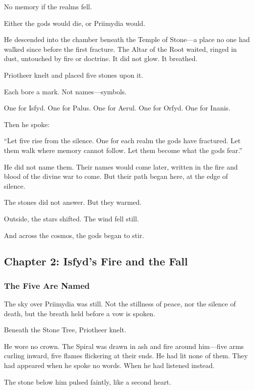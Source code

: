 \documentclass[12pt]{article}
\begin{document}
No memory if the realms fell. 

Either the gods would die, or Priimydia would.

He descended into the chamber beneath the Temple of Stone—a place no one had walked since before the first fracture. The Altar of the Root waited, ringed in dust, untouched by fire or doctrine. It did not glow. It breathed.

Priotheer knelt and placed five stones upon it.

Each bore a mark. Not names—symbols.

One for Isfyd. One for Palus. One for Aerul. One for Orfyd. One for Inanis.

Then he spoke:

“Let five rise from the silence. One for each realm the gods have fractured.  
Let them walk where memory cannot follow.  
Let them become what the gods fear.”

He did not name them. Their names would come later, written in the fire and blood of the divine war to come. But their path began here, at the edge of silence.

The stones did not answer. But they warmed.

Outside, the stars shifted. The wind fell still.

And across the cosmos, the gods began to stir.

\newpage

\subsection{Chapter 2: Isfyd's Fire and the Fall}

\vspace{.5in}

\subsubsection{The Five Are Named}

The sky over Priimydia was still. Not the stillness of peace, nor the silence of death, but the breath held before a vow is spoken.

Beneath the Stone Tree, Priotheer knelt.

He wore no crown. The Spiral was drawn in ash and fire around him—five arms curling inward, five flames flickering at their ends. He had lit none of them. They had appeared when he spoke no words. When he had listened instead.

The stone below him pulsed faintly, like a second heart.
\end{document}
